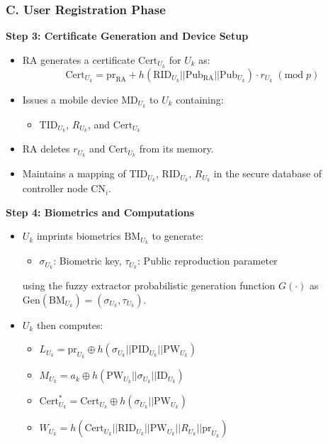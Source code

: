 \documentclass[9pt,handout]{beamer}
\begin{document}
\begin{frame}
    \frametitle{C. User Registration Phase}

    \textbf{Step 3: Certificate Generation and Device Setup}
    \begin{itemize}
        \item RA generates a certificate \( \text{Cert}_{U_k} \) for \( U_k \) as:
        \[
        \text{Cert}_{U_k} = \text{pr}_{\text{RA}} + h(\text{RID}_{U_k} || \text{Pub}_{\text{RA}} || \text{Pub}_{U_k}) \cdot r_{U_k} \; (\text{mod} \; p)
        \]
        \item Issues a mobile device \( \text{MD}_{U_k} \) to \( U_k \) containing:
        \begin{itemize}
            \item \( \text{TID}_{U_k} \), \( R_{U_k} \), and \( \text{Cert}_{U_k} \)
        \end{itemize}
        \item RA deletes \( r_{U_k} \) and \( \text{Cert}_{U_k} \) from its memory.
        \item Maintains a mapping of \( \text{TID}_{U_k} \), \( \text{RID}_{U_k} \), \( R_{U_k} \) in the secure database of controller node \( \text{CN}_i \).
    \end{itemize}
     \textbf{Step 4: Biometrics and Computations}

    \begin{itemize}
        \item \( U_k \) imprints biometrics \( \text{BM}_{U_k} \) to generate:
        \begin{itemize}
            \item \(\sigma_{U_k}\): Biometric key, \(\tau_{U_k}\): Public reproduction parameter
        \end{itemize}
        using the fuzzy extractor probabilistic generation function \( G(\cdot) \) as \( \text{Gen}(\text{BM}_{U_k}) = (\sigma_{U_k}, \tau_{U_k}) \).
        
        \item \( U_k \) then computes:
        \begin{itemize}
            \item \( L_{U_k} = \text{pr}_{U_k} \oplus h(\sigma_{U_k} || \text{PID}_{U_k} || \text{PW}_{U_k}) \)
            \item \( M_{U_k} = a_k \oplus h(\text{PW}_{U_k} || \sigma_{U_k} || \text{ID}_{U_k}) \)
            \item \( \text{Cert}^*_{U_k} = \text{Cert}_{U_k} \oplus h(\sigma_{U_k} || \text{PW}_{U_k}) \)
            \item \( W_{U_k} = h(\text{Cert}_{U_k} || \text{RID}_{U_k} || \text{PW}_{U_k} || R_{U_k} || \text{pr}_{U_k}) \)
        \end{itemize}
    \end{itemize}
\end{frame}
\end{document}
